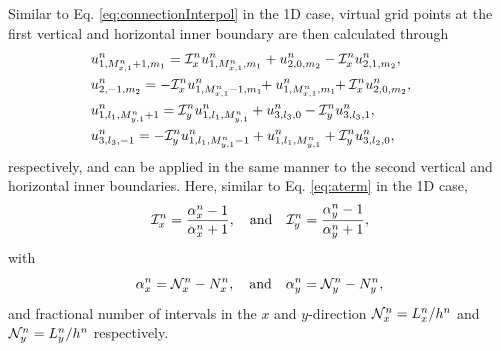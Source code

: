 \documentclass[fleqn]{jaes}
\begin{document}
Similar to Eq. \eqref{eq:connectionInterpol} in the 1D case, virtual grid points at the first vertical and horizontal inner boundary are then calculated through
\begin{subequations}\label{eq:connectionInterpol2D}
    \begin{align}
            &\!\!\!\!\!\!\!\!u_{1, M_{x,1}^n+1, m_1}^n = \Aterm_x u_{1, M_{x,1}^n, m_1}^n + u_{2, 0, m_2}^n - \Aterm_x u_{2, 1, m_2}^n,\\
            &\!\!\!\!\!\!\!\!u_{2, -1, m_2}^n = -\Aterm_x u_{1, M_{x, 1}^n-1, m_1}^n\!\! + u_{1, M_{x,1}^n, m_1}^n\!\!+\Aterm_x u_{2, 0, m_2}^n,\\
            &\!\!\!\!\!\!\!\!u_{1, l_1, M_{y,1}^n+1}^n = \Aterm_y u_{1, l_1, M_{y,1}^n}^n + u_{3, l_3, 0}^n - \Aterm_y u_{3, l_3, 1}^n,\\
            &\!\!\!\!\!\!\!\!u_{3, l_3, -1}^n = -\Aterm_y u_{1, l_1, M_{y, 1}^n-1}^n + u_{1, l_1, M_{y,1}^n}^n+\Aterm_y u_{3, l_2, 0}^n,
    \end{align}
\end{subequations}
respectively, and can be applied in the same manner to the second vertical and horizontal inner boundaries. Here, similar to Eq. \eqref{eq:aterm} in the 1D case, 
\begin{equation}\label{eq:axayDef}
    \Aterm_x = \frac{\alpha_x^n-1}{\alpha_x^n+1}, \qaq \Aterm_y = \frac{\alpha_y^n-1}{\alpha_y^n+1},
\end{equation}
with 
\begin{equation}
    \alpha_x^n = \Nfrac_x^n - N_x^n, \qaq \alpha_y^n = \Nfrac_y^n - N_y^n,
\end{equation}
and fractional number of intervals in the $x$ and $y$-direction $\mathcal{N}_x^n = L_x^n / h^n$ and $\mathcal{N}_y^n = L_y^n / h^n$ respectively.
\end{document}
